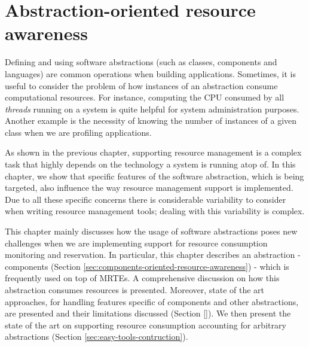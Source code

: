 \chapter{Abstraction-oriented resource awareness}
\label{chap:abstractions_and_resource_management}


Defining and using software abstractions (such as classes, components and languages) are common operations when building applications.
Sometimes, it is useful to consider the problem of how instances of an abstraction consume computational resources.
For instance, computing the CPU consumed by all \textit{threads} running on a system is quite helpful for system administration purposes.
Another example is the necessity of knowing the number of instances of a given class when we are profiling applications.

As shown in the previous chapter, supporting resource management is a complex task that highly depends on the technology a system is running atop of.
In this chapter, we show that specific features of the software abstraction, which is being targeted, also influence the way resource management support is implemented.
Due to all these specific concerns there is considerable variability to consider when writing resource management tools; dealing with this variability is complex.


This chapter mainly discusses how the usage of software abstractions poses new challenges when we are implementing support for resource consumption monitoring and reservation.
In particular, this chapter describes an abstraction - components (Section \ref{sec:components-oriented-resource-awareness}) - which is frequently used on top of MRTEs.
A comprehensive discussion on how this abstraction consumes resources is presented.
Moreover, state of the art approaches, for handling features specific of components and other abstractions, are presented and their limitations discussed (Section \ref{}).
We then present the state of the art on supporting resource consumption accounting for arbitrary abstractions (Section \ref{sec:easy-tools-contruction}).

